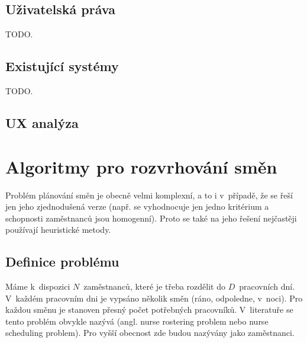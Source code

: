 \documentclass[twoside]{ctuthesis}
\begin{document}
\section{Uživatelská práva}
TODO.


\section{Existující systémy}
TODO.



\section{UX analýza}



\chapter{Algoritmy pro rozvrhování směn}
Problém plánování směn je obecně velmi komplexní, a to i v~případě, že se řeší jen jeho zjednodušená verze (např. se vyhodnocuje jen jedno kritérium a schopnosti zaměstnanců jsou homogenní). \cite{cai2000genetic} Proto se také na jeho řešení nejčastěji používají heuristické metody.


\section{Definice problému}
Máme k~dispozici $N$~zaměstnanců, které je třeba rozdělit do $D$~pracovních dní. V~každém pracovním dni je vypsáno několik směn (ráno, odpoledne, v~noci). Pro každou směnu je stanoven přesný počet potřebných pracovníků. V~literatuře se tento problém obvykle nazývá  (angl. nurse rostering problem nebo nurse scheduling problem). Pro vyšší obecnost zde budou  nazývány jako zaměstnanci.
\end{document}
